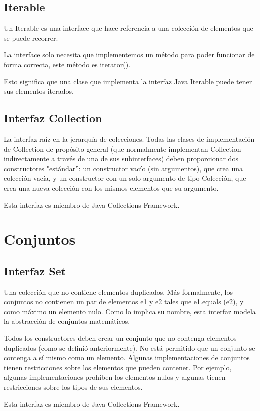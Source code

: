 \documentclass[11pt]{article}
\begin{document}
\subsection{Iterable}
\par
Un Iterable es una interface que hace referencia a una colección de 
elementos que se puede recorrer.
\par
La interface solo necesita que implementemos un método para poder 
funcionar de forma correcta, este método es iterator().
\par
Esto significa que una clase que implementa la interfaz Java Iterable 
puede tener sus elementos iterados. 

\subsection{Interfaz Collection}
\par
La interfaz raíz en la jerarquía de colecciones. Todas las clases de 
implementación de Collection de propósito general (que normalmente 
implementan Collection indirectamente a través de una de sus 
subinterfaces) deben proporcionar dos constructores "estándar'': un 
constructor vacío (sin argumentos), que crea una colección vacía, y 
un constructor con un solo argumento de tipo Colección, que crea una 
nueva colección con los mismos elementos que su argumento. 

\par
Esta interfaz es miembro de Java Collections Framework.


\section{Conjuntos}

\subsection{Interfaz Set}
\par
Una colección que no contiene elementos duplicados. Más formalmente, 
los conjuntos no contienen un par de elementos e1 y e2 tales que 
e1.equals (e2), y como máximo un elemento nulo. Como lo implica su 
nombre, esta interfaz modela la abstracción de conjuntos matemáticos.
\par
Todos los constructores deben crear un conjunto que no contenga 
elementos duplicados (como se definió anteriormente). No está 
permitido que un conjunto se contenga a sí mismo como un elemento. 
Algunas implementaciones de conjuntos tienen restricciones sobre los 
elementos que pueden contener. Por ejemplo, algunas implementaciones 
prohíben los elementos nulos y algunas tienen restricciones sobre los 
tipos de sus elementos.
\par
Esta interfaz es miembro de Java Collections Framework.
\end{document}

